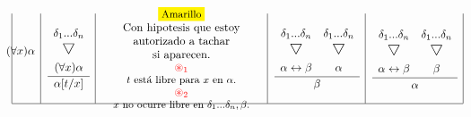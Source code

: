 \documentclass[a4paper, 12pt]{article}
\newcommand\triangulo{\scaleobj{1.3}{\bigtriangledown}}
\begin{document}
\begin{equation*}
\begin{array}{|c|c|c|c|c|}
\begin{matrix}
{\begin{matrix}
    \end{matrix}}{(\forall x)\alpha}
  \\
  \ 
\end{matrix}
&
\begin{matrix}
  \\
  \cfrac{
    \begin{matrix}
      \begin{array}{c}
        \delta_1 ... \delta_n \\
          \triangulo \vspace{2mm}\\
        (\forall x)\alpha
      \end{array} \\
    \end{matrix}}{\alpha[t/x]}
  \\
  \
\end{matrix}
&
\parbox[c][5em][c]{5cm}{\centering  {\small \colorbox{yellow}{Amarillo}\\}Con \mbox{hipotesis} que estoy\\ autorizado a tachar\\ si aparecen.\\
\normalsize\textcolor{red}{$\circledast_1$}\small\\$t$ está libre para $x$ en $\alpha$. \\
\normalsize\textcolor{red}{$\circledast_2$}\small\\$x$ no ocurre libre en $\delta_1 ... \delta_n, \beta$.}
&
\begin{matrix}
  \cfrac{
  \begin{matrix}
  \begin{array}{cc}
    \ \\
        \delta_1 ... \delta_n & \delta_1 ... \delta_n \\
        \triangulo & \triangulo \vspace{2mm}\\
        \alpha \leftrightarrow \beta & \alpha
      \end{array} \\
    \end{matrix}}{\beta}\\
  \ 
\end{matrix}
&
\begin{matrix}
  \cfrac{
  \begin{matrix}
  \begin{array}{cc}
    \ \\
        \delta_1 ... \delta_n & \delta_1 ... \delta_n \\
        \triangulo & \triangulo \vspace{2mm}\\
        \alpha \leftrightarrow \beta & \beta
      \end{array} \\
    \end{matrix}}{\alpha} \\
  \ 
\end{matrix}
\\ \hline
\end{array}
\end{equation*}
\end{document}
